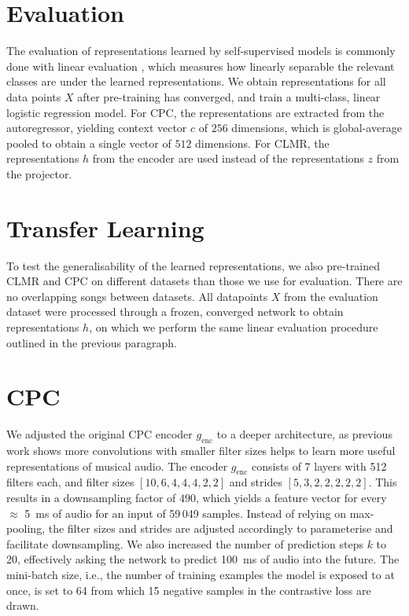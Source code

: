 \documentclass{report}
\begin{document}
\section{Evaluation}
\label{evaluation}
The evaluation of representations learned by self-supervised models is commonly done with linear evaluation \cite{oord_representation_2019,hjelm_learning_2019,chen_simple_2020}, which measures how linearly separable the relevant classes are under the learned representations. We obtain representations for all data points $X$ after pre-training has converged, and train a multi-class, linear logistic regression model. For CPC, the representations are extracted from the autoregressor, yielding context vector $c$ of $256$ dimensions, which is global-average pooled to obtain a single vector of $512$ dimensions. For CLMR, the representations $h$ from the encoder are used instead of the representations $z$ from the projector. 


\section{Transfer Learning}
To test the generalisability of the learned representations, we also pre-trained CLMR and CPC on different datasets than those we use for evaluation. There are no overlapping songs between datasets. All datapoints $X$ from the evaluation dataset were processed through a frozen, converged network to obtain representations $h$, on which we perform the same linear evaluation procedure outlined in the previous paragraph. 


\section{CPC}
We adjusted the original CPC encoder $g_{\mathrm{enc}}$ to a deeper architecture, as previous work\cite{lee2018samplecnn} shows more convolutions with smaller filter sizes helps to learn more useful representations of musical audio. The encoder $g_{\mathrm{enc}}$ consists of 7 layers with 512 filters each, and filter sizes $[10, 6, 4, 4, 4, 2, 2]$ and strides $[5, 3, 2, 2, 2, 2, 2]$. This results in a downsampling factor of $490$, which yields a feature vector for every $\approx$ 5~ms of audio for an input of 59\,049 samples. Instead of relying on max-pooling, the filter sizes and strides are adjusted accordingly to parameterise and facilitate downsampling. We also increased the number of prediction steps $k$ to 20, effectively asking the network to predict 100~ms of audio into the future. The mini-batch size, i.e., the number of training examples the model is exposed to at once, is set to 64 from which 15 negative samples in the contrastive loss are drawn.
\end{document}
